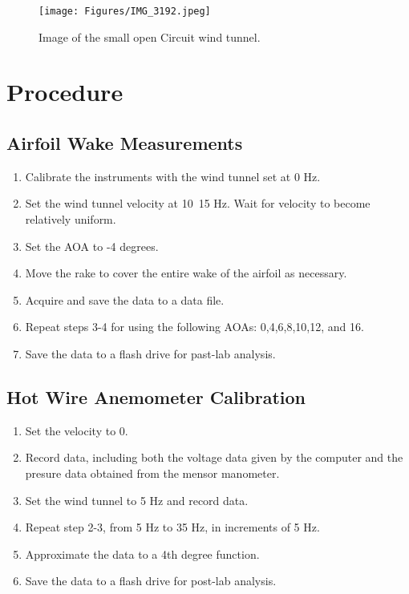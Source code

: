 \begin{figure}[htpb]
    \centering
    \texttt{[image: Figures/IMG\_3192.jpeg]}
    \caption[Image of the small open Circuit wind tunnel.]{Image of the small open Circuit wind tunnel.}
    \label{fig: AirFoilAndPressureRake}
\end{figure}

\newpage
\section{Procedure}\label{sec:procedures}
\subsection{Airfoil Wake Measurements}
\begin{enumerate}
\item Calibrate the instruments with the wind tunnel set at 0 Hz.
\item Set the wind tunnel velocity at 10~15 Hz. Wait for velocity to become relatively uniform. 
\item Set the AOA to -4 degrees. 
\item Move the rake to cover the entire wake of the airfoil as necessary.
\item Acquire and save the data to a data file.
\item Repeat steps 3-4 for using the following AOAs: 0,4,6,8,10,12, and 16.
\item Save the data to a flash drive for past-lab analysis.
\end{enumerate}

\subsection{Hot Wire Anemometer Calibration}

\begin{enumerate}
\item Set the velocity to 0. \item Record data, including both the voltage data given by the computer and the presure data obtained from the mensor manometer.
\item Set the wind tunnel to 5 Hz and record data. 
\item Repeat step 2-3, from 5 Hz to 35 Hz, in increments of 5 Hz. 
\item Approximate the data to a 4th degree function. 
\item Save the data to a flash drive for post-lab analysis.
\end{enumerate}

